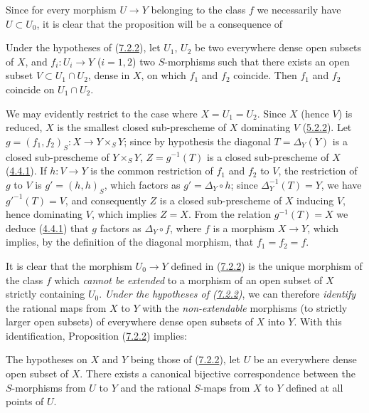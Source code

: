 Since for every morphism $U\to Y$ belonging to the class $f$ we necessarily
have $U\subset U_0$, it is clear that the proposition will be a consequence
of

\begin{lemma}[7.2.2.1]
\label{I.7.2.2.1}
Under the hypotheses of (\hyperref[I.7.2.2]{7.2.2}), let $U_1$, $U_2$ be
two everywhere dense open subsets of $X$, and $f_i:U_i\to Y$ ($i=1,2$) two
$S$-morphisms such that there exists an open subset $V\subset U_1\cap U_2$, dense
in $X$, on which $f_1$ and $f_2$ coincide. Then $f_1$ and $f_2$ coincide on
$U_1\cap U_2$.
\end{lemma}

We may evidently restrict to the case where $X=U_1=U_2$. Since $X$ (hence
$V$) is reduced, $X$ is the smallest closed sub-prescheme of $X$ dominating $V$
(\hyperref[I.5.2.2]{5.2.2}). Let
$g=(f_1,f_2)_S:X\to Y\times_S Y$; since by hypothesis the diagonal
$T=\Delta_Y(Y)$ is a closed sub-prescheme of $Y\times_S Y$,
$Z=g^{-1}(T)$ is a closed sub-prescheme of $X$
(\hyperref[I.4.4.1]{4.4.1}). If $h:V\to Y$ is the common restriction of
$f_1$ and $f_2$ to $V$, the restriction of $g$ to $V$ is $g'=(h,h)_S$, which
factors as $g'=\Delta_Y\circ h$; since $\Delta_Y^{-1}(T)=Y$, we have
$g'^{-1}(T)=V$, and consequently $Z$ is a closed sub-prescheme of $X$ inducing
$V$, hence dominating $V$, which implies $Z=X$. From the relation
$g^{-1}(T)=X$ we deduce (\hyperref[I.4.4.1]{4.4.1}) that $g$ factors as
$\Delta_Y\circ f$, where $f$ is a morphism $X\to Y$, which implies, by the
definition of the diagonal morphism, that $f_1=f_2=f$.

It is clear that the morphism $U_0\to Y$ defined in
(\hyperref[I.7.2.2]{7.2.2}) is the unique morphism of the class $f$ which
\emph{cannot be extended} to a morphism of an open subset of $X$ strictly
containing $U_0$. \emph{Under the hypotheses of
(\hyperref[I.7.2.2]{7.2.2})}, we can therefore \emph{identify} the
rational maps from $X$ to $Y$ with the \emph{non-extendable} morphisms (to
strictly larger open subsets) of everywhere dense open subsets of $X$ into $Y$.
With this identification, Proposition
(\hyperref[I.7.2.2]{7.2.2}) implies:

\begin{corollary}[7.2.3]
\label{I.7.2.3}
The hypotheses on $X$ and $Y$ being those of
(\hyperref[I.7.2.2]{7.2.2}), let $U$ be an everywhere dense open subset of
$X$. There exists a canonical bijective correspondence between the
$S$-morphisms from $U$ to $Y$ and the rational $S$-maps from $X$ to $Y$
defined at all points of $U$.
\end{corollary}

